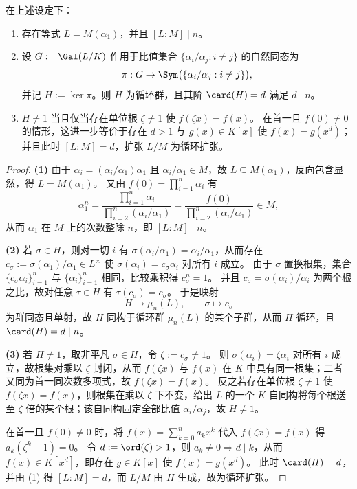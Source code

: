 \begin{proposition}[比值域与分裂域的次数整除律及其对称性判别]\label{prop:ratio-field-splitting}
在上述设定下：
\begin{enumerate}
  \item 存在等式 \(L=M(\alpha_1)\)，并且 \([L:M]\mid n\)。
  \item 设 \(G:=\Gal(L/K)\) 作用于比值集合 \(\{\alpha_i/\alpha_j:i\neq j\}\) 的自然同态为
  \[
  \pi:G\to \Sym\bigl(\{\alpha_i/\alpha_j:i\neq j\}\bigr),
  \]
  并记 \(H:=\ker\pi\)。则 \(H\) 为循环群，且其阶 \(\card(H)=d\) 满足 \(d\mid n\)。
  \item \(H\neq 1\) 当且仅当存在单位根 \(\zeta\neq 1\) 使 \(f(\zeta x)=f(x)\)。
  在首一且 \(f(0)\neq 0\) 的情形，这进一步等价于存在 \(d>1\) 与 \(g(x)\in K[x]\) 使
  \(
  f(x)=g(x^d)
  \)；
  并且此时 \([L:M]=d\)，扩张 \(L/M\) 为循环扩张。
\end{enumerate}
\end{proposition}
\begin{proof}
\textbf{(1)} 由于 \(\alpha_i=(\alpha_i/\alpha_1)\alpha_1\) 且 \(\alpha_i/\alpha_1\in M\)，故 \(L\subseteq M(\alpha_1)\)，反向包含显然，得 \(L=M(\alpha_1)\)。
又由 \(f(0)=\prod_{i=1}^n\alpha_i\) 有
\[
\alpha_1^n=\frac{\prod_{i=1}^n\alpha_i}{\prod_{i=2}^n(\alpha_i/\alpha_1)}
=\frac{f(0)}{\prod_{i=2}^n(\alpha_i/\alpha_1)}\in M,
\]
从而 \(\alpha_1\) 在 \(M\) 上的次数整除 \(n\)，即 \([L:M]\mid n\)。

\textbf{(2)} 若 \(\sigma\in H\)，则对一切 \(i\) 有
\(
\sigma(\alpha_i/\alpha_1)=\alpha_i/\alpha_1
\)，从而存在 \(c_{\sigma}:=\sigma(\alpha_1)/\alpha_1\in L^{\times}\) 使
\(
\sigma(\alpha_i)=c_{\sigma}\alpha_i
\) 对所有 \(i\) 成立。
由于 \(\sigma\) 置换根集，集合 \(\{c_{\sigma}\alpha_i\}_{i=1}^n\) 与 \(\{\alpha_i\}_{i=1}^n\) 相同，比较乘积得 \(c_{\sigma}^n=1\)。
并且 \(c_{\sigma}=\sigma(\alpha_i)/\alpha_i\) 为两个根之比，故对任意 \(\tau\in H\) 有 \(\tau(c_{\sigma})=c_{\sigma}\)。
于是映射
\[
H\to \mu_n(L),\qquad \sigma\mapsto c_{\sigma}
\]
为群同态且单射，故 \(H\) 同构于循环群 \(\mu_n(L)\) 的某个子群，从而 \(H\) 循环，且 \(\card(H)=d\mid n\)。

\textbf{(3)} 若 \(H\neq 1\)，取非平凡 \(\sigma\in H\)，令 \(\zeta:=c_{\sigma}\neq 1\)。
则 \(\sigma(\alpha_i)=\zeta\alpha_i\) 对所有 \(i\) 成立，故根集对乘以 \(\zeta\) 封闭，从而 \(f(\zeta x)\) 与 \(f(x)\) 在 \(\bar K\) 中具有同一根集；二者又同为首一同次数多项式，故 \(f(\zeta x)=f(x)\)。
反之若存在单位根 \(\zeta\neq 1\) 使 \(f(\zeta x)=f(x)\)，则根集在乘以 \(\zeta\) 下不变，给出 \(L\) 的一个 \(K\)-自同构将每个根送至 \(\zeta\) 倍的某个根；该自同构固定全部比值 \(\alpha_i/\alpha_j\)，故 \(H\neq 1\)。

在首一且 \(f(0)\neq 0\) 时，将 \(f(x)=\sum_{k=0}^n a_k x^k\) 代入 \(f(\zeta x)=f(x)\) 得 \(a_k(\zeta^k-1)=0\)。
令 \(d:=\ord(\zeta)>1\)，则 \(a_k\neq 0\Rightarrow d\mid k\)，从而 \(f(x)\in K[x^d]\)，即存在 \(g\in K[x]\) 使 \(f(x)=g(x^d)\)。
此时 \(\card(H)=d\)，并由 (1) 得 \([L:M]=d\)，而 \(L/M\) 由 \(H\) 生成，故为循环扩张。
\end{proof}


